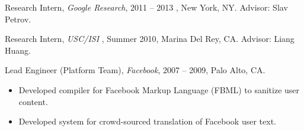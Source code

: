 \documentclass[10pt]{article}
\begin{document}
{{{%


{%

\bigskip






\bigskip

\ind Research Intern, {\sl Google Research}, 2011 -- 2013 , New York, NY.  Advisor: Slav Petrov.



\ind Research Intern, {\sl USC/ISI },  Summer 2010, Marina Del Rey, CA. Advisor: Liang Huang.

\bigskip



\medskip
\ind  Lead Engineer (Platform Team), {\sl Facebook}, 2007 -- 2009, Palo Alto, CA.
\begin{itemize}
	\item Developed compiler for Facebook Markup Language (FBML) to sanitize user content.
	\item Developed system for crowd-sourced translation of Facebook user text.
\end{itemize}





}}}}
\end{document}
